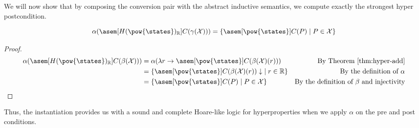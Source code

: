 We will now show that by composing the conversion pair with the abstract 
inductive semantics, we compute exactly the strongest hyper postcondition.
\begin{theorem}
  \label{thm:hyperpost} 
  $$\alpha(\asem[H(\pow{\states})_\mathbb{R}]{C}(\gamma(\mathcal{X}))) = 
  \{ \asem[\pow{\states}]{C}(P) \mid P \in \mathcal{X} \}$$
\end{theorem}
\begin{proof}
  \begin{align*}
    \alpha(\asem[H(\pow{\states})_\mathbb{R}]{C}(\beta(\mathcal{X})))
      &= \alpha(\lambda r \to \asem[\pow{\states}]{C}(\beta(\mathcal{X})(r)))
      &\text{By Theorem \ref{thm:hyper-add}} \\
      &= \{ \asem[\pow{\states}]{C}(\beta(\mathcal{X})(r))\downarrow \;
        \mid r \in \mathbb{R} \}
      &\text{By the definition of $\alpha$}\\
      &= \{ \asem[\pow{\states}]{C}(P) \mid P \in \mathcal{X} \}
      &\text{By the definition of $\beta$ and injectivity}\\
  \end{align*}
\end{proof}

Thus, the instantiation provides us with a sound and complete Hoare-like logic 
for hyperproperties when we apply $\alpha$ on the pre and post conditions.


